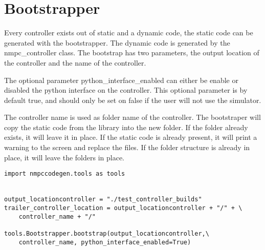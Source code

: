 \section{Bootstrapper}

Every controller exists out of static and a dynamic code, the static code can be generated with the bootstrapper. The dynamic code is generated by the nmpc\_controller class. The bootstrap has two parameters, the output location of the controller and the name of the controller. 

The optional parameter python\_interface\_enabled can either be enable or disabled the python interface on the controller. This optional parameter is by default true, and should only be set on false if the user will not use the simulator.

The controller name is used as folder name of the controller. The bootstraper will copy the static code from the library into the new folder. If the folder already exists, it will leave it in place. If the static code is already present, it will print a warning to the screen and replace the files. If the folder structure is already in place, it will leave the folders in place.

\begin{lstlisting}[caption={Optional features},captionpos=b,label={lst:bootstrapper}]
import nmpccodegen.tools as tools


output_locationcontroller = "./test_controller_builds" 
trailer_controller_location = output_locationcontroller + "/" + \
	controller_name + "/"

tools.Bootstrapper.bootstrap(output_locationcontroller,\
	controller_name, python_interface_enabled=True)
\end{lstlisting}